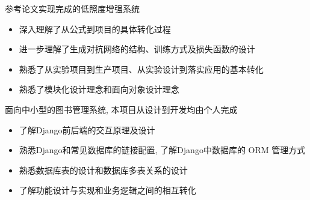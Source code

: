 \documentclass{resume}
\begin{document}
\begin{onehalfspacing}
参考论文实现完成的低照度增强系统
\begin{itemize}
  \item 深入理解了从公式到项目的具体转化过程
  \item 进一步理解了生成对抗网络的结构、训练方式及损失函数的设计
  \item 熟悉了从实验项目到生产项目、从实验设计到落实应用的基本转化
  \item 熟悉了模块化设计理念和面向对象设计理念
\end{itemize}
\end{onehalfspacing}

\begin{onehalfspacing}
面向中小型的图书管理系统, 本项目从设计到开发均由个人完成
\begin{itemize}
  \item 了解Django前后端的交互原理及设计
  \item 熟悉Django和常见数据库的链接配置, 了解Django中数据库的 ORM 管理方式
  \item 熟悉数据库表的设计和数据库多表关系的设计
  \item 了解功能设计与实现和业务逻辑之间的相互转化
\end{itemize}
\end{onehalfspacing}
\end{document}
